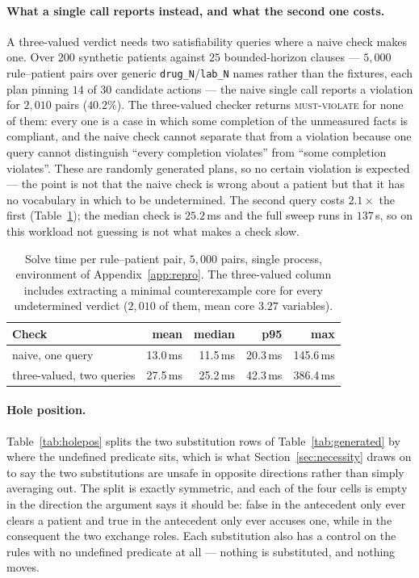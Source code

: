 \documentclass{article}
\begin{document}
\paragraph{What a single call reports instead, and what the second one costs.}
A three-valued verdict needs two satisfiability queries where a naive check
makes one. Over $200$ synthetic patients against $25$ bounded-horizon clauses
--- $5{,}000$ rule--patient pairs over generic \texttt{drug\_N}/\texttt{lab\_N}
names rather than the fixtures, each plan pinning $14$ of $30$ candidate
actions --- the naive single call reports a violation for $2{,}010$ pairs
($40.2\%$). The three-valued checker returns \textsc{must-violate} for none of
them: every one is a case in which some completion of the unmeasured facts is
compliant, and the naive check cannot separate that from a violation because
one query cannot distinguish ``every completion violates'' from ``some
completion violates''. These are randomly generated plans, so no certain
violation is expected --- the point is not that the naive check is wrong about
a patient but that it has no vocabulary in which to be undetermined. The
second query costs $2.1\times$ the first (Table~\ref{tab:perf}); the median
check is $25.2$\,ms and the full sweep runs in $137$\,s, so on this workload
not guessing is not what makes a check slow.

\begin{table}[h]
  \centering
  \caption{Solve time per rule--patient pair, $5{,}000$ pairs, single process,
  environment of Appendix~\ref{app:repro}. The three-valued column includes
  extracting a minimal counterexample core for every undetermined verdict
  ($2{,}010$ of them, mean core $3.27$ variables).}
  \label{tab:perf}
  \begin{tabular}{lrrrr}
    \toprule
    Check & mean & median & p95 & max \\
    \midrule
    naive, one query      & 13.0\,ms & 11.5\,ms & 20.3\,ms & 145.6\,ms \\
    three-valued, two queries & 27.5\,ms & 25.2\,ms & 42.3\,ms & 386.4\,ms \\
    \bottomrule
  \end{tabular}
\end{table}

\paragraph{Hole position.}
Table~\ref{tab:holepos} splits the two substitution rows of
Table~\ref{tab:generated} by where the undefined predicate sits, which is
what Section~\ref{sec:necessity} draws on to say the two substitutions are
unsafe in opposite directions rather than simply averaging out. The split is
exactly symmetric, and each of the four cells is empty in the direction the
argument says it should be: \textsf{false} in the antecedent only ever clears
a patient and \textsf{true} in the antecedent only ever accuses one, while in
the consequent the two exchange roles. Each substitution also has a control on
the rules with no undefined predicate at all --- nothing is substituted, and
nothing moves.
\end{document}
